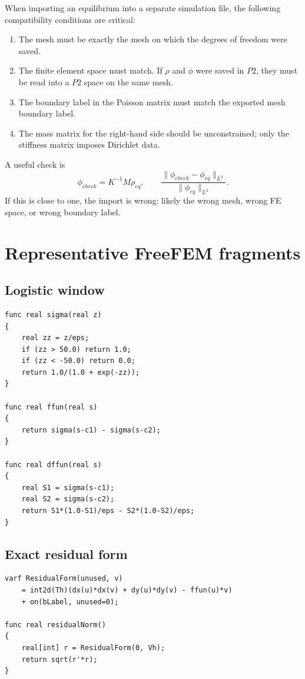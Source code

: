 \documentclass[11pt,a4paper]{article}
\begin{document}
When importing an equilibrium into a separate simulation file, the following compatibility conditions are critical:
\begin{enumerate}[leftmargin=2em]
  \item The mesh must be exactly the mesh on which the degrees of freedom were saved.
  \item The finite element space must match. If $\rho$ and $\phi$ were saved in $P2$, they must be read into a $P2$ space on the same mesh.
  \item The boundary label in the Poisson matrix must match the exported mesh boundary label.
  \item The mass matrix for the right-hand side should be unconstrained; only the stiffness matrix imposes Dirichlet data.
\end{enumerate}

A useful check is
\begin{equation}
  \phi_{check}=K^{-1}M\rho_{eq},
  \qquad
  \frac{\|\phi_{check}-\phi_{eq}\|_{L^2}}{\|\phi_{eq}\|_{L^2}}.
\end{equation}
If this is close to one, the import is wrong: likely the wrong mesh, wrong FE space, or wrong boundary label.

\section{Representative FreeFEM fragments}

\subsection{Logistic window}
\begin{lstlisting}[style=ff]
func real sigma(real z)
{
    real zz = z/eps;
    if (zz > 50.0) return 1.0;
    if (zz < -50.0) return 0.0;
    return 1.0/(1.0 + exp(-zz));
}

func real ffun(real s)
{
    return sigma(s-c1) - sigma(s-c2);
}

func real dffun(real s)
{
    real S1 = sigma(s-c1);
    real S2 = sigma(s-c2);
    return S1*(1.0-S1)/eps - S2*(1.0-S2)/eps;
}
\end{lstlisting}

\subsection{Exact residual form}
\begin{lstlisting}[style=ff]
varf ResidualForm(unused, v)
    = int2d(Th)(dx(u)*dx(v) + dy(u)*dy(v) - ffun(u)*v)
    + on(bLabel, unused=0);

func real residualNorm()
{
    real[int] r = ResidualForm(0, Vh);
    return sqrt(r'*r);
}
\end{lstlisting}
\end{document}

